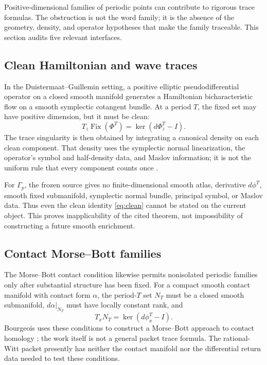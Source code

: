 \documentclass[11pt]{article}
\theoremstyle{definition}
\theoremstyle{remark}
\begin{document}
Positive-dimensional families of periodic points can contribute to rigorous
trace formulas.  The obstruction is not the word family; it is the absence of
the geometry, density, and operator hypotheses that make the family
traceable.  This section audits five relevant interfaces.

\subsection{Clean Hamiltonian and wave traces}

In the Duistermaat--Guillemin setting, a positive elliptic
pseudodifferential operator on a closed smooth manifold generates a
Hamiltonian bicharacteristic flow on a smooth symplectic cotangent bundle.
At a period \(T\), the fixed set may have positive dimension, but it must be
clean:
\begin{equation}
 T_z\operatorname{Fix}(\Phi^T)
   =\ker(d\Phi_z^T-I).
 \label{eq:clean}
\end{equation}
The trace singularity is then obtained by integrating a canonical density on
each clean component.  That density uses the symplectic normal linearization,
the operator's symbol and half-density data, and Maslov information; it is not
the uniform rule that every component counts once
\citep{DuistermaatGuillemin1975}.

For \(\Gamma_p\), the frozen source gives no finite-dimensional smooth atlas,
derivative \(d\phi^T\), smooth fixed submanifold, symplectic normal bundle,
principal symbol, or Maslov data.  Thus even the clean identity
\eqref{eq:clean} cannot be stated on the current object.  This proves
inapplicability of the cited theorem, not impossibility of constructing a
future smooth enrichment.

\subsection{Contact Morse--Bott families}

The Morse--Bott contact condition likewise permits nonisolated periodic
families only after substantial structure has been fixed.  For a compact
smooth contact manifold with contact form \(\alpha\), the period-\(T\) set
\(N_T\) must be a closed smooth submanifold, \(d\alpha|_{N_T}\) must have
locally constant rank, and
\[
 T_xN_T=\ker(d\phi_x^T-I).
\]
Bourgeois uses these conditions to construct a Morse--Bott approach to
contact homology \citep{Bourgeois2003}; the work itself is not a general
packet trace formula.  The rational-Witt packet presently has neither the
contact manifold nor the differential return data needed to test these
conditions.
\end{document}
